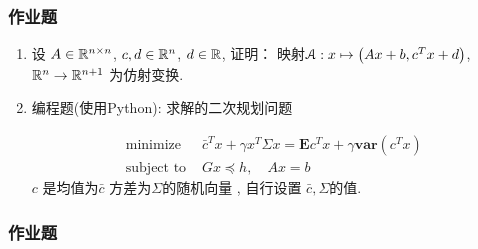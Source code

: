 \documentclass[handout]{beamer}
\begin{document}
\begin{frame}
	
	
	
	\begin{frame}[fragile]
		\frametitle{作业题 }
		
		\begin{footnotesize}
			
			\begin{enumerate}
				\item 设 $A\in \mathbb{R}^{n\times n}$, $c,d\in \mathbb{R}^n$, $d\in \mathbb{R}$, 证明： 	
				映射$\mathcal{A}:  x\mapsto \left(A x+b, c^{T} x+d\right)$, $\mathbb{R}^n\rightarrow \mathbb{R}^{n+1}$ 为仿射变换.   
				
				\item   编程题(使用Python): 求解的二次规划问题  
				
				\begin{equation}
					\begin{array}{ll}
						\text { minimize } & \bar{c}^{T} x+\gamma x^{T} \Sigma x=\mathbf{E} c^{T} x+\gamma \textbf{var}\left(c^{T} x\right) \\
						\text { subject to } & G x \preceq h, \quad A x=b
					\end{array}
				\end{equation}
				$c$ 是均值为$\bar{c}$ 方差为$\Sigma$的随机向量 , 自行设置 $\bar{c} , \Sigma$的值. 	
		\end{enumerate}
	
  \end{footnotesize}		

 \end{frame}
		
			
		\begin{frame}
			\frametitle{作业题 }
			

\end{frame}
\end{frame}
\end{document}
